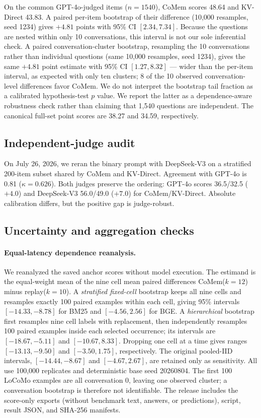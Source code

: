 On the common GPT-4o-judged items ($n{=}1540$), CoMem scores 48.64 and KV-Direct
43.83. A paired per-item bootstrap of their difference (10,000 resamples,
seed 1234) gives $+4.81$ points with 95\% CI $[2.34,7.34]$. Because the questions
are nested within only 10 conversations, this interval is not our sole
inferential check. A paired conversation-cluster bootstrap, resampling the 10
conversations rather than individual questions (same 10,000 resamples,
seed 1234), gives the same $+4.81$ point estimate with 95\% CI $[1.27,8.32]$ ---
wider than the per-item interval, as expected with only ten clusters; 8 of the
10 observed conversation-level differences favor CoMem. We do not interpret
the bootstrap tail fraction as a calibrated hypothesis-test $p$ value. We report the latter as a
dependence-aware robustness check rather than claiming that 1,540 questions are
independent. The canonical full-set point
scores are 38.27 and 34.59, respectively.

\FloatBarrier
\subsection{Independent-judge audit}
On July 26, 2026, we reran the binary prompt with DeepSeek-V3 on a stratified 200-item subset
shared by CoMem and KV-Direct. Agreement with GPT-4o is 0.81
($\kappa=0.626$). Both judges preserve the ordering: GPT-4o scores
36.5/32.5 ($+4.0$) and DeepSeek-V3 56.0/49.0 ($+7.0$) for CoMem/KV-Direct.
Absolute calibration differs, but the positive gap is judge-robust.

\subsection{Uncertainty and aggregation checks}
\paragraph{Equal-latency dependence reanalysis.}
We reanalyzed the saved anchor scores without model execution. The estimand is
the equal-weight mean of the nine cell mean paired differences
CoMem($k{=}12$) minus replay($k{=}10$). A \emph{stratified fixed-cell}
bootstrap keeps all nine cells and resamples exactly 100 paired examples within
each cell, giving 95\% intervals $[-14.33,-8.78]$ for BM25 and
$[-4.56,2.56]$ for BGE. A \emph{hierarchical} bootstrap first resamples nine
cell labels with replacement, then independently resamples 100 paired examples
inside each selected occurrence; its intervals are $[-18.67,-5.11]$ and
$[-10.67,8.33]$. Dropping one cell at a time gives ranges
$[-13.13,-9.50]$ and $[-3.50,1.75]$, respectively. The original pooled-IID
intervals, $[-14.44,-8.67]$ and $[-4.67,2.67]$, are retained only as
sensitivity. All use 100,000 replicates and deterministic base seed 20260804.
The first 100 LoCoMo examples are all conversation 0, leaving one observed
cluster; a conversation bootstrap is therefore not identifiable. The release
includes the score-only exports (without benchmark text, answers, or
predictions), script, result JSON, and SHA-256 manifests.


